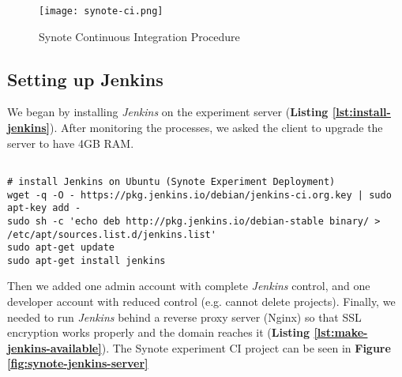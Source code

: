 \begin{figure}[!hbt]
  	\centering
 	\texttt{[image: synote-ci.png]}
  	\caption{Synote Continuous Integration Procedure}
 	\label{fig:synote-ci-proc}
\end{figure}

\subsection{Setting up Jenkins}
\label{subsec:setting-up-jenkins}

We began by installing \textit{Jenkins} on the experiment server (\textbf{Listing \ref{lst:install-jenkins}}). After monitoring the processes, we asked the client to upgrade the server to have 4GB RAM.\\

\begin{listing}[H]
\begin{verbatim}

# install Jenkins on Ubuntu (Synote Experiment Deployment)
wget -q -O - https://pkg.jenkins.io/debian/jenkins-ci.org.key | sudo apt-key add -
sudo sh -c 'echo deb http://pkg.jenkins.io/debian-stable binary/ > /etc/apt/sources.list.d/jenkins.list'
sudo apt-get update
sudo apt-get install jenkins

\end{verbatim}
\label{lst:install-jenkins}
\end{listing}

Then we added one admin account with complete \textit{Jenkins} control, and one developer account with reduced control (e.g. cannot delete projects). Finally, we needed to run \textit{Jenkins} behind a reverse proxy server (Nginx) so that SSL encryption works properly and the domain reaches it (\textbf{Listing \ref{lst:make-jenkins-available}}). The Synote experiment CI project can be seen in \textbf{Figure \ref{fig:synote-jenkins-server}}\\


